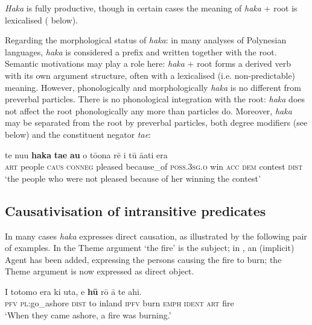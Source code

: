 \textit{Haka} is fully productive, though in certain cases the meaning of \textit{haka} + root is lexicalised ( below).

Regarding the morphological status of \textit{haka}: in many analyses of Polynesian languages, \textit{haka} is considered a prefix and written together with the root. Semantic motivations may play a role here: \textit{haka} + root forms a derived verb with its own argument structure, often with a lexicalised (i.e. non-predictable) meaning. However, phonologically and morphologically \textit{haka} is no different from preverbal particles. There is no phonological integration with the root: \textit{haka} does not affect the root phonologically any more than particles do. Moreover, \textit{haka} may be separated from the root by preverbal particles, both degree modifiers (see  below) and the constituent negator \textit{ta{\ꞌ}e}:

\ea\label{ex:8.220}
\gll te nu{\ꞌ}u \textbf{haka} \textbf{ta{\ꞌ}e} \textbf{au} {\ꞌ}o tō{\ꞌ}ona rē i tū {\ꞌ}ā{\ꞌ}ati era  \\
\textsc{art} people \textsc{caus} \textsc{conneg} pleased because\_of \textsc{poss.3sg.o} win \textsc{acc} \textsc{dem} contest \textsc{dist}  \\

\glt 
‘the people who were not pleased because of her winning the contest’ \textstyleExampleref{[R347.036]} 
\z

\subsection{Causativisation of intransitive predicates}\label{sec:8.12.2}
In many cases \textit{haka} expresses direct causation, as illustrated by the following pair of examples. In  the Theme argument ‘the fire’ is the subject; in , an (implicit) Agent has been added, expressing the persons causing the fire to burn; the Theme argument is now expressed as direct object.

\ea\label{ex:8.221}
\gll I totomo era ki {\ꞌ}uta, e \textbf{hū} rō {\ꞌ}ā te ahi. \\
\textsc{pfv} \textsc{pl}:go\_ashore \textsc{dist} to inland \textsc{ipfv} burn \textsc{emph} \textsc{ident} \textsc{art} fire \\

\glt 
‘When they came ashore, a fire was burning.’ \textstyleExampleref{[R359.019]} 
\z

